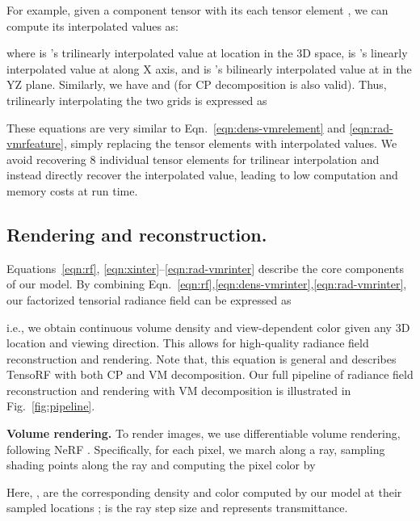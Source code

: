 \documentclass[runningheads]{llncs}
\newcommand{\boldstartspace}[1]{\vspace{0.1in}\noindent\textbf{#1}}
\begin{document}
For example, given a component tensor  with its each tensor element , we can compute its interpolated values as:

where  is 's trilinearly interpolated value at location  in the 3D space,  is 's linearly interpolated value at  along X axis, and  is 's bilinearly interpolated value at  in the YZ plane. Similarly, we have  and  (for CP decomposition  is also valid).
Thus, trilinearly interpolating the two grids is expressed as

These equations are very similar to Eqn.~\ref{eqn:dens-vmrelement} and \ref{eqn:rad-vmrfeature}, simply replacing the tensor elements with interpolated values.
We avoid recovering 8 individual tensor elements for trilinear interpolation and instead directly recover the interpolated value, leading to low computation and memory costs at run time.


\subsection{Rendering and reconstruction.}
\label{sec:rendering_reconstruction}
Equations~\ref{eqn:rf}, \ref{eqn:xinter}--\ref{eqn:rad-vmrinter} describe the core components of our model. By combining Eqn.~\ref{eqn:rf},\ref{eqn:dens-vmrinter},\ref{eqn:rad-vmrinter}, our factorized tensorial radiance field can be expressed as

i.e., we obtain continuous volume density and view-dependent color given any 3D location and viewing direction. 
This allows for high-quality radiance field reconstruction and rendering.
Note that, this equation is general and describes TensoRF with both CP and VM decomposition.
Our full pipeline of radiance field reconstruction and rendering with VM decomposition is illustrated in Fig.~\ref{fig:pipeline}.

\boldstartspace{Volume rendering.} 
To render images, we use differentiable volume rendering, following NeRF \cite{mildenhall2020nerf}. Specifically, for each pixel, we march along a ray, sampling  shading points along the ray and computing the pixel color by

Here, ,  are the corresponding density and color computed by our model at their sampled locations ;  is the ray step size and  represents transmittance. 
\end{document}
